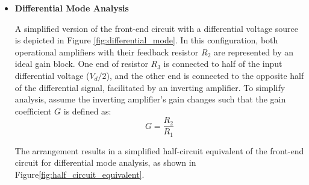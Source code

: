 \begin{itemize}
\item \textbf{Differential Mode Analysis}


A simplified version of the front-end circuit with a differential voltage source is depicted in Figure \ref{fig:differential_mode}. In this configuration, both operational amplifiers with their feedback resistor \(R_2\) are represented by an ideal gain block. One end of resistor \(R_3\) is connected to half of the input differential voltage (\(V_d/2\)), and the other end is connected to the opposite half of the differential signal, facilitated by an inverting amplifier. To simplify analysis, assume the inverting amplifier's gain changes such that the gain coefficient \(G\) is defined as:
\begin{equation}
	G = \frac{R_2}{R_1}
	\label{eq:gain}
\end{equation}

The arrangement results in a simplified half-circuit equivalent of the front-end circuit for differential mode analysis, as shown in Figure\ref{fig:half_circuit_equivalent}.


\end{itemize}
